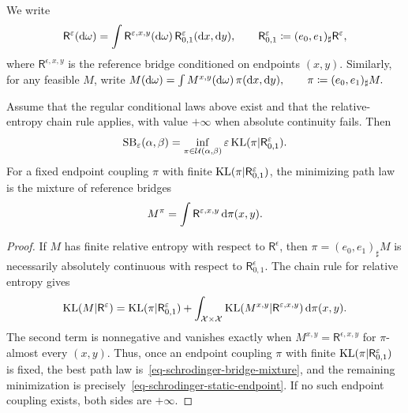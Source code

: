 We write
\[
\mathsf R^\varepsilon(\mathrm{d}\omega)
=
\int \mathsf R^{\varepsilon,x,y}(\mathrm{d}\omega)\,
\mathsf R^\varepsilon_{0,1}(\mathrm{d} x,\mathrm{d} y),
\qquad
\mathsf R^\varepsilon_{0,1}\coloneqq(e_0,e_1)_\sharp\mathsf R^\varepsilon,
\]
where $\mathsf R^{\epsilon,x,y}$ is the reference bridge conditioned on endpoints $(x,y)$. Similarly, for any feasible $M$, write
\(M(\mathrm{d}\omega) = \int M^{x,y}(\mathrm{d}\omega)\,\pi(\mathrm{d} x,\mathrm{d} y), \qquad \pi\coloneqq(e_0,e_1)_\sharp M.\)
\begin{prop}\label{prop-schrodinger-endpoint-reduction}
Assume that the regular conditional laws above exist and that the relative-entropy chain rule applies, with value $+\infty$ when absolute continuity fails. Then
\begin{equation}\label{eq-schrodinger-static-endpoint}
\mathrm{SB}_\varepsilon(\alpha,\beta)
=
\inf_{\pi\in\mathcal{U}(\alpha,\beta)}
\varepsilon\operatorname{KL}(\pi|\mathsf R^\varepsilon_{0,1}).
\end{equation}
For a fixed endpoint coupling $\pi$ with finite $\operatorname{KL}(\pi|\mathsf R^\varepsilon_{0,1})$, the minimizing path law is the mixture of reference bridges
\begin{equation}\label{eq-schrodinger-bridge-mixture}
M^\pi
=
\int \mathsf R^{\varepsilon,x,y}\,\mathrm{d}\pi(x,y).
\end{equation}
\end{prop}
\begin{proof}
If $M$ has finite relative entropy with respect to $\mathsf R^\epsilon$, then $\pi=(e_0,e_1)_\sharp M$ is necessarily absolutely continuous with respect to $\mathsf R^\epsilon_{0,1}$. The chain rule for relative entropy gives
\begin{equation}\label{eq-kl-chain-rule-path}
\operatorname{KL}(M|\mathsf R^\varepsilon)
=
\operatorname{KL}(\pi|\mathsf R^\varepsilon_{0,1})
+
\int_{\mathcal{X}\times\mathcal{X}}
\operatorname{KL}(M^{x,y}|\mathsf R^{\varepsilon,x,y})
\,\mathrm{d}\pi(x,y).
\end{equation}
The second term is nonnegative and vanishes exactly when $M^{x,y}=\mathsf R^{\epsilon,x,y}$ for $\pi$-almost every $(x,y)$. Thus, once an endpoint coupling $\pi$ with finite $\operatorname{KL}(\pi|\mathsf R^\varepsilon_{0,1})$ is fixed, the best path law is~\eqref{eq-schrodinger-bridge-mixture}, and the remaining minimization is precisely~\eqref{eq-schrodinger-static-endpoint}. If no such endpoint coupling exists, both sides are $+\infty$.
\end{proof}
